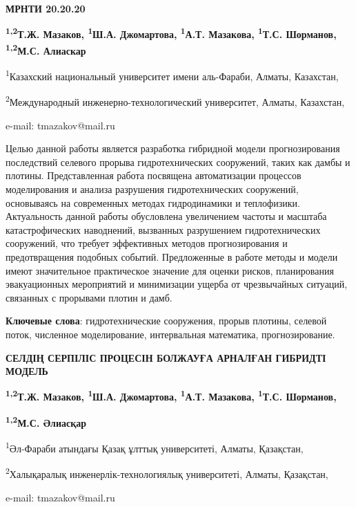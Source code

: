 \newpage
{\bfseries МРНТИ 20.20.20}


\begin{center}
{\bfseries \textsuperscript{1,2}Т.Ж. Мазаков, \textsuperscript{1}Ш.А.
Джомартова, \textsuperscript{1}А.Т. Мазакова, \textsuperscript{1}Т.С.
Шорманов, \textsuperscript{1,2}М.С. Алиаскар}

\textsuperscript{1}Казахский национальный университет имени аль-Фараби,
Алматы, Казахстан,

\textsuperscript{2}Международный инженерно-технологический университет,
Алматы, Казахстан,

e-mail: tmazakov@mail.ru
\end{center}

Целью данной работы является разработка гибридной модели прогнозирования
последствий селевого прорыва гидротехнических сооружений, таких как
дамбы и плотины. Представленная работа посвящена автоматизации процессов
моделирования и анализа разрушения гидротехнических сооружений,
основываясь на современных методах гидродинамики и теплофизики.
Актуальность данной работы обусловлена увеличением частоты и масштаба
катастрофических наводнений, вызванных разрушением гидротехнических
сооружений, что требует эффективных методов прогнозирования и
предотвращения подобных событий. Предложенные в работе методы и модели
имеют значительное практическое значение для оценки рисков, планирования
эвакуационных мероприятий и минимизации ущерба от чрезвычайных ситуаций,
связанных с прорывами плотин и дамб.

{\bfseries Ключевые слова}: гидротехнические сооружения, прорыв плотины,
селевой поток, численное моделирование, интервальная математика,
прогнозирование.

\begin{center}
{\large\bfseries СЕЛДІҢ СЕРПІЛІС ПРОЦЕСІН БОЛЖАУҒА АРНАЛҒАН ГИБРИДТІ МОДЕЛЬ}

{\bfseries \textsuperscript{1,2}Т.Ж. Мазаков, \textsuperscript{1}Ш.А.
Джомартова, \textsuperscript{1}А.Т. Мазакова, \textsuperscript{1}Т.С.
Шорманов,}

{\bfseries \textsuperscript{1,2}М.С. Әлиасқар}

\textsuperscript{1}Әл-Фараби атындағы Қазақ ұлттық университеті, Алматы,
Қазақстан,

\textsuperscript{2}Халықаралық инженерлік-технологиялық университеті,
Алматы, Қазақстан,

e-mail: tmazakov@mail.ru
\end{center}

